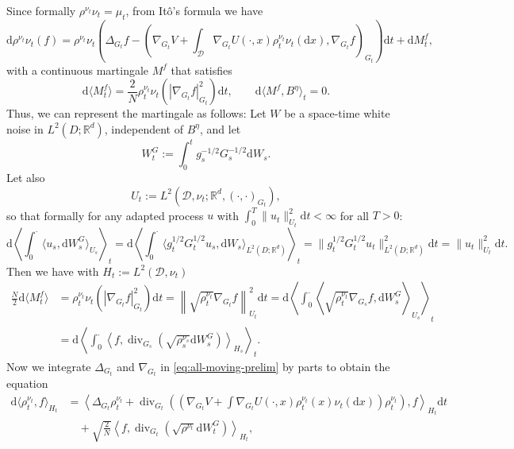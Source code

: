 \documentclass[11pt, a4paper]{article}
\newcommand{\cdummy}{\cdot}
\newcommand{\mathd}{\mathrm{d}}
\newcommand{\tmop}[1]{\ensuremath{\operatorname{#1}}}
\begin{document}
Since formally  $\rho^{\nu_t} \nu_t = \mu_t$, from It\^o's formula we have
\begin{equation}\label{eq:all-moving-prelim}
    \mathd \rho^{\nu_t} \nu_t (f) = \rho^{\nu_t} \nu_t \left( \Delta_{G_t} f -
   \left( \nabla_{G_t} V + \int_\mathcal{D} \nabla_{G_{t}} U (\cdummy, x) \rho^{\nu_t}_t
   \nu_t (\mathd x), \nabla_{G_{t}} f \right)_{G_t} \right) \mathd t + \mathd
   M^f_t,
\end{equation}
with a continuous martingale $M^f$ that satisfies
\[ \mathd \langle M^f_t \rangle = \frac2N \rho^{\nu_t}_t \nu_t (| \nabla_{G_t} f
   |_{G_t}^2)\mathd t, \qquad \mathd \langle M^f, B^\eta \rangle_t = 0. \]
Thus, we can represent the martingale as follows: Let $W$ be a space-time
white noise in $L^2 (D ; \mathbb{R}^d)$, independent of $B^\eta$, and let
\begin{equation}
    W^G_t := \int_0^t g_s^{- 1 / 2} G_s^{- 1 / 2} \mathd W_s . 
\end{equation}
Let also
\[ U_t := L^2 (\mathcal{D}, \nu_t ; \mathbb{R}^d, (\cdummy, \cdummy)_{G_t}), \]
so that formally for any adapted process $u$ with $\int_0^T \| u_t \|_{U_t}^2 \mathd t < \infty$ for all $T>0$:
\[ \mathd \left\langle \int_0^{\cdummy} \langle u_s, \mathd W^G_s \rangle_{U_s}
   \right\rangle_t = \mathd \left\langle \int_0^{\cdummy} \langle g_t^{1 / 2}
   G_t^{1 / 2} u_s, \mathd W_s \rangle_{L^2 (D ; \mathbb{R}^d)} \right\rangle_t
   = \| g_t^{1 / 2} G_t^{1 / 2} u_t \|_{L^2 (D ; \mathbb{R}^d)}^2 \mathd t = \|
   u_t \|_{U_t}^2 \mathd t. \]
Then we have with  $H_t := L^2 (\mathcal{D}, \nu_t)$
\begin{align*}
  \frac{N}{2}\mathd \langle M^f_t \rangle & = \rho^{\nu_t}_t \nu_t (| \nabla_{G_t} f
  |_{G_t}^2) \mathd t = \left\| \sqrt{\rho^{\nu_t}_t} \nabla_{G_t} f \right\|_{U_t}^2 \mathd
  t = \mathd \left\langle \int_0^{\cdummy} \left\langle
  \sqrt{\rho^{\nu_t}_t} \nabla_{G_s} f, \mathd W^G_s \right\rangle_{U_s}
  \right\rangle_t\\
  & = \mathd \left\langle \int_0^{\cdummy} \left\langle f, \tmop{div}_{G_s}
  \left( \sqrt{\rho^{\nu_s}_s} \mathd W^G_s \right) \right\rangle_{H_s}
  \right\rangle_t.
\end{align*}
Now we  integrate $\Delta_{G_t}$ and $\nabla_{G_t}$ in \eqref{eq:all-moving-prelim} by parts to obtain the equation
\begin{align*}
  \mathd \langle \rho^{\nu_t}_t, f \rangle_{H_t} & = \left\langle
  \Delta_{G_t} \rho^{\nu_t}_t + \tmop{div}_{G_t} \left( \left(
  \nabla_{G_t} V + \int \nabla_{G_t} U (\cdummy, x) \rho^{\nu_t}_t (x) \nu_t
  (\mathd x) \right) \rho^{\nu_t}_t \right), f \right\rangle_{H_t} \mathd t\\
  &\quad +\sqrt{\frac2N} \left\langle f, \tmop{div}_{G_t} \left( \sqrt{\rho^{\nu_t}} \mathd
  W^G_t \right) \right\rangle_{H_t},
\end{align*}
\end{document}
